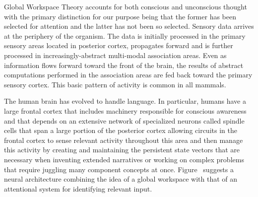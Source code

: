 Global Workspace Theory accounts for both conscious and unconscious thought with the primary distinction for our purpose being that the former has been selected for attention and the latter has not been so selected. Sensory data arrives at the periphery of the organism. The data is initially processed in the primary sensory areas located in posterior cortex, propagates forward and is further processed in increasingly-abstract multi-modal association areas. Even as information flows forward toward the front of the brain, the results of abstract computations performed in the association areas are fed back toward the primary sensory cortex. This basic pattern of activity is common in all mammals. 

The human brain has evolved to handle language. In particular, humans have a large frontal cortex that includes machinery responsible for conscious awareness and that depends on an extensive network of specialized neurons called spindle cells that span a large portion of the posterior cortex allowing circuits in the frontal cortex to sense relevant activity throughout this area and then manage this activity by creating and maintaining the persistent state vectors that are necessary when inventing extended narratives or working on complex problems that require juggling many component concepts at once. Figure~{} suggests a neural architecture combining the idea of a global workspace with that of an attentional system for identifying relevant input.


\setcounter{figure}{50}



